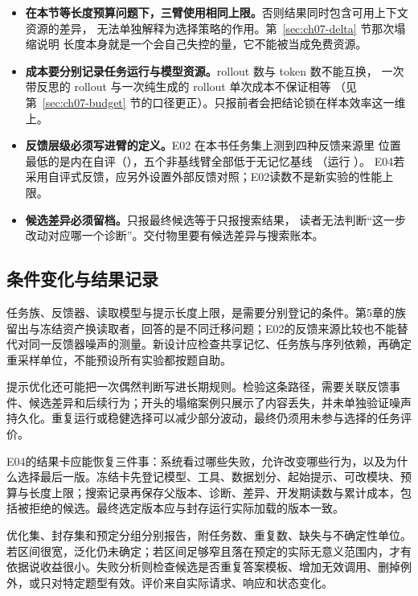 \begin{itemize}
\sloppy
  \item \textbf{在本节等长度预算问题下，三臂使用相同上限。}否则结果同时包含可用上下文资源的差异，
        无法单独解释为选择策略的作用。第~\ref{sec:ch07-delta} 节那次塌缩说明
        长度本身就是一个会自己失控的量，它不能被当成免费资源。
  \item \textbf{成本要分别记录任务运行与模型资源。}rollout 数与 token 数不能互换，
        一次带反思的 rollout 与一次纯生成的 rollout 单次成本不保证相等
        （见第~\ref{sec:ch07-budget} 节的口径更正）。只报前者会把结论锁在样本效率这一维上。
  \item \textbf{反馈层级必须写进臂的定义。}E02 在本书任务集上测到四种反馈来源里
        位置最低的是内在自评（），五个非基线臂全部低于无记忆基线
        （运行 ）。
        E04若采用自评式反馈，应另外设置外部反馈对照；E02读数不是新实验的性能上限。
  \item \textbf{候选差异必须留档。}只报最终候选等于只报搜索结果，
        读者无法判断“这一步改动对应哪一个诊断”。交付物里要有候选差异与搜索账本。
\end{itemize}


\subsection{条件变化与结果记录}
\label{sec:ch07-conditions}
任务族、反馈器、读取模型与提示长度上限，是需要分别登记的条件。第5章的族留出与冻结资产换读取者，回答的是不同迁移问题；E02的反馈来源比较也不能替代对同一反馈器噪声的测量。新设计应检查共享记忆、任务族与序列依赖，再确定重采样单位，不能预设所有实验都按题自助。

提示优化还可能把一次偶然判断写进长期规则。检验这条路径，需要关联反馈事件、候选差异和后续行为；开头的塌缩案例只展示了内容丢失，并未单独验证噪声持久化。重复运行或稳健选择可以减少部分波动，最终仍须用未参与选择的任务评价。

\label{sec:ch07-result-card}
E04的结果卡应能恢复三件事：系统看过哪些失败，允许改变哪些行为，以及为什么选择最后一版。冻结卡先登记模型、工具、数据划分、起始提示、可改模块、预算与长度上限；搜索记录再保存父版本、诊断、差异、开发期读数与累计成本，包括被拒绝的候选。最终选定版本应与封存运行实际加载的版本一致。

优化集、封存集和预定分组分别报告，附任务数、重复数、缺失与不确定性单位。若区间很宽，泛化仍未确定；若区间足够窄且落在预定的实际无意义范围内，才有依据说收益很小。失败分析则检查候选是否重复答案模板、增加无效调用、删掉例外，或只对特定题型有效。评价来自实际请求、响应和状态变化。

